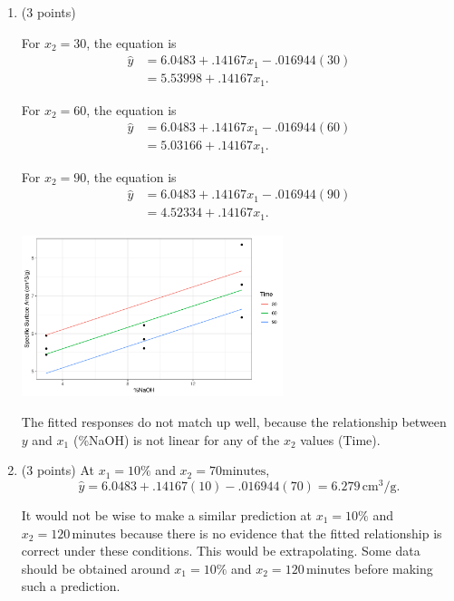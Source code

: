 \documentclass{article}\usepackage[]{graphicx}\usepackage[]{color}
\newenvironment{knitrout}{}{} %
\begin{document}
\begin{enumerate}
\begin{enumerate}
  \item (3 points)
  
  For $x_2 = 30$, the equation is
  \begin{align*}
  \hat{y} &= 6.0483 + .14167 x_1 - .016944(30) \\
  & = 5.53998 + .14167 x_1.
  \end{align*}
  
  For $x_2 = 60$, the equation is
  \begin{align*}
  \hat{y} &= 6.0483 + .14167 x_1 - .016944(60) \\
  & = 5.03166 + .14167 x_1.
  \end{align*}
  
  For $x_2 = 90$, the equation is
  \begin{align*}
  \hat{y} &= 6.0483 + .14167 x_1 - .016944(90) \\
  & = 4.52334 + .14167 x_1.
  \end{align*}
  
\begin{knitrout}
\color{fgcolor}

{\centering \includegraphics[width=0.6\textwidth]{figure/unnamed-chunk-10-1} 

}



\end{knitrout}
  
  The fitted responses do not match up well, because the relationship between $y$ and $x_1$ (\%NaOH) is not linear for any of the $x_2$ values (Time).
  
  \item (3 points)
  At $x_1 = 10\%$ and $x_2 = 70\mathrm{minutes}$,
  \[\hat{y} = 6.0483 + .14167(10) - .016944(70) = 6.279\mathrm{\,cm}^3\mathrm{\slash g}.\]
  
  It would not be wise to make a similar prediction at $x_1 = 10\%$ and $x_2 = 120 \mathrm{\,minutes}$ because there is no evidence that the fitted relationship is correct under these conditions. This would be extrapolating. Some data should be obtained around $x_1 = 10\%$ and $x_2 = 120 \mathrm{\,minutes}$ before making such a prediction.
  

\end{enumerate}
\end{enumerate}
\end{document}
